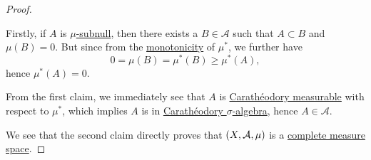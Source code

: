 \begin{proof}
\begin{explanation}
		\par Firstly, if \(A\) is \hyperref[def:mu-subnull-set]{\(\mu \)-subnull}, then there exists a \(B\in \mathcal{A} \) such that \(A\subset B\) and \(\mu (B) = 0\). But since from
		the \hyperref[def:outer-measure-montonicity]{monotonicity} of \(\mu ^{*} \), we further have
		\[
			0 = \mu(B) = \mu ^{*} (B) \geq \mu ^{*} (A),
		\]
		hence \(\mu ^{*} (A) = 0\).

		\par  From the first claim, we immediately see that \(A\) is \hyperref[def:C-measurable]{Carathéodory measurable} with respect to \(\mu ^{*}\),
		which implies \(A\) is in \hyperref[thm:Caratheodory-extension-Thm]{Carathéodory \(\sigma\)-algebra}, hence \(A\in \mathcal{A} \).
	\end{explanation}

	We see that the second claim directly proves that \((X, \mathcal{\MakeUppercase{a}} , \mu )\) is a \hyperref[def:complete-measure-space]{complete measure space}.
\end{proof}

